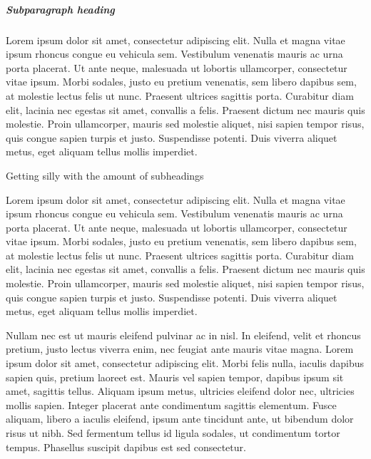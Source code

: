 \documentclass[doc,longtable]{apa6}
\begin{document}
\subparagraph{Subparagraph heading}\label{subparagraph-heading}

Lorem ipsum dolor sit amet, consectetur adipiscing elit. Nulla et magna vitae ipsum rhoncus congue eu vehicula sem. Vestibulum venenatis mauris ac urna porta placerat. Ut ante neque, malesuada ut lobortis ullamcorper, consectetur vitae ipsum. Morbi sodales, justo eu pretium venenatis, sem libero dapibus sem, at molestie lectus felis ut nunc. Praesent ultrices sagittis porta. Curabitur diam elit, lacinia nec egestas sit amet, convallis a felis. Praesent dictum nec mauris quis molestie. Proin ullamcorper, mauris sed molestie aliquet, nisi sapien tempor risus, quis congue sapien turpis et justo. Suspendisse potenti. Duis viverra aliquet metus, eget aliquam tellus mollis imperdiet.

Getting silly with the amount of subheadings

Lorem ipsum dolor sit amet, consectetur adipiscing elit. Nulla et magna vitae ipsum rhoncus congue eu vehicula sem. Vestibulum venenatis mauris ac urna porta placerat. Ut ante neque, malesuada ut lobortis ullamcorper, consectetur vitae ipsum. Morbi sodales, justo eu pretium venenatis, sem libero dapibus sem, at molestie lectus felis ut nunc. Praesent ultrices sagittis porta. Curabitur diam elit, lacinia nec egestas sit amet, convallis a felis. Praesent dictum nec mauris quis molestie. Proin ullamcorper, mauris sed molestie aliquet, nisi sapien tempor risus, quis congue sapien turpis et justo. Suspendisse potenti. Duis viverra aliquet metus, eget aliquam tellus mollis imperdiet.

Nullam nec est ut mauris eleifend pulvinar ac in nisl. In eleifend, velit et rhoncus pretium, justo lectus viverra enim, nec feugiat ante mauris vitae magna. Lorem ipsum dolor sit amet, consectetur adipiscing elit. Morbi felis nulla, iaculis dapibus sapien quis, pretium laoreet est. Mauris vel sapien tempor, dapibus ipsum sit amet, sagittis tellus. Aliquam ipsum metus, ultricies eleifend dolor nec, ultricies mollis sapien. Integer placerat ante condimentum sagittis elementum. Fusce aliquam, libero a iaculis eleifend, ipsum ante tincidunt ante, ut bibendum dolor risus ut nibh. Sed fermentum tellus id ligula sodales, ut condimentum tortor tempus. Phasellus suscipit dapibus est sed consectetur.

\newpage

\printbibliography[title=References]
\end{document}
